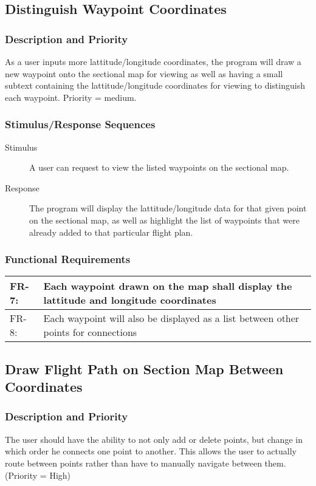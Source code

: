 \documentclass[12pt, letterpaper]{article}
\begin{document}
\subsection{Distinguish Waypoint Coordinates}
\subsubsection{Description and Priority}
As a user inputs more lattitude/longitude coordinates,
    the program will draw a new waypoint onto the sectional map for viewing
    as well as having a small subtext containing the lattitude/longitude coordinates for viewing to distinguish each waypoint.
Priority = medium.

\subsubsection{Stimulus/Response Sequences}
\begin{description}
    \item[Stimulus] A user can request to view the listed waypoints on the sectional map.
    \item[Response] The program will display the lattitude/longitude data for that given point on the sectional map,
        as well as highlight the list of waypoints that were already added to that particular flight plan.
\end{description}

\subsubsection{Functional Requirements}
\begin{tabularx}{\textwidth}{|l|X|} \hline
FR-7: & Each waypoint drawn on the map shall display the lattitude and longitude coordinates\\ \hline
FR-8: & Each waypoint will also be displayed as a list between other points for connections\\ \hline
\end{tabularx}

\subsection{Draw Flight Path on Section Map Between Coordinates}
\subsubsection{Description and Priority}
The user should have the ability to not only add or delete points, but change in which order he connects one point to another.
This allows the user to actually route between points rather than have to manually navigate between them.
(Priority = High)
\end{document}

